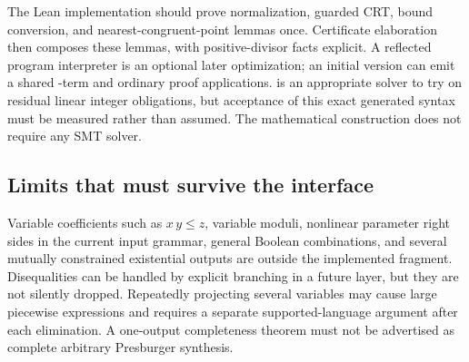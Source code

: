 The Lean implementation should prove normalization, guarded CRT, bound
conversion, and nearest-congruent-point lemmas once. Certificate elaboration
then composes these lemmas, with positive-divisor facts explicit. A reflected
program interpreter is an optional later optimization; an initial version can
emit a shared -term and ordinary proof applications. 
is an appropriate solver to try on residual linear integer obligations, but
acceptance of this exact generated syntax must be measured rather than assumed.
The mathematical construction does not require any SMT solver.

\subsection{Limits that must survive the interface}
Variable coefficients such as $x\,y\le z$, variable moduli, nonlinear parameter
right sides in the current input grammar, general Boolean combinations, and
several mutually constrained existential outputs are outside the implemented
fragment. Disequalities can be handled by explicit branching in a future layer,
but they are not silently dropped. Repeatedly projecting several variables may
cause large piecewise expressions and requires a separate supported-language
argument after each elimination. A one-output completeness theorem must not be
advertised as complete arbitrary Presburger synthesis.
